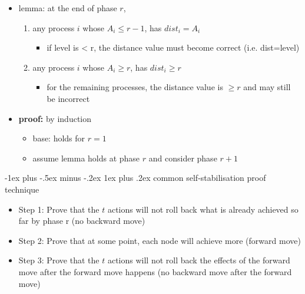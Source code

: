 \documentclass[10pt, landscape]{article}
\makeatletter
\renewcommand{\subsubsection}{\@startsection{subsubsection}{3}{0mm}%
  {-1ex plus -.5ex minus -.2ex}%
  {1ex plus .2ex}%
{\normalfont\small\bfseries}}%
\makeatother
\begin{document}
\begin{multicols*}{3}
\begin{itemize}
\begin{enumerate}
\begin{itemize}
          \end{itemize}
      \end{enumerate}
    \item lemma: at the end of phase $r$,
      \begin{enumerate}
        \item any process $i$ whose $A_i \leq r-1$, has $dist_i = A_i$
          \begin{itemize}
            \item if level is < r, the distance value must become correct (i.e. dist=level)
          \end{itemize}
        \item any process $i$ whose $A_i \geq r$, has $dist_i \geq r$
          \begin{itemize}
            \item for the remaining processes, the distance value is $\geq r$ and may still be incorrect
          \end{itemize}
      \end{enumerate}
    \item \textbf{proof:} by induction
      \begin{itemize}
        \item base: holds for $r=1$ 
        \item assume lemma holds at phase $r$ and consider phase $r+1$
      \end{itemize}
  \end{itemize}

  \subsubsection{common self-stabilisation proof technique}

  \begin{itemize}
    \item Step 1: Prove that the $t$ actions will not roll back what is already achieved so far by phase r (no backward move)
    \item Step 2: Prove that at some point, each node will achieve more (forward move)
    \item Step 3: Prove that the $t$ actions will not roll back the effects of the forward move after the forward move happens (no backward move after the forward move)
  \end{itemize}

\end{multicols*}
\end{document}
